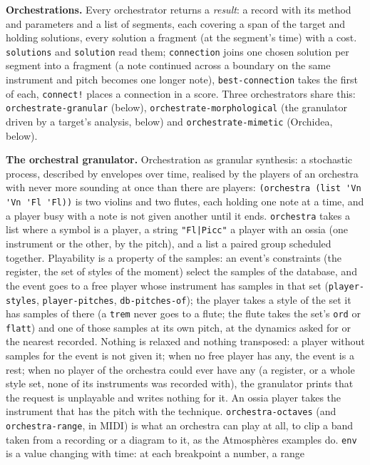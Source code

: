 \documentclass[11pt,a4paper]{article}
\newcommand{\musil}[1]{\lstinline[style=musilinline]{#1}}
\begin{document}
\textbf{Orchestrations.} Every orchestrator returns a \emph{result}: a record with its
method and parameters and a list of segments, each covering a span of the target and
holding solutions, every solution a fragment (at the segment's time) with a cost.
\musil{solutions} and \musil{solution} read them; \musil{connection} joins one chosen
solution per segment into a fragment (a note continued across a boundary on the same
instrument and pitch becomes one longer note), \musil{best-connection} takes the first
of each, \musil{connect!} places a connection in a score. Three orchestrators share this:
\musil{orchestrate-granular} (below), \musil{orchestrate-morphological} (the granulator driven by a target's analysis, below) and
\musil{orchestrate-mimetic} (Orchidea, below).

\textbf{The orchestral granulator.} Orchestration as granular synthesis: a stochastic
process, described by envelopes over time, realised by the players of an orchestra with
never more sounding at once than there are players: \musil{(orchestra (list 'Vn 'Vn 'Fl
'Fl))} is two violins and two flutes, each holding one note at a time, and a player busy
with a note is not given another until it ends. \musil{orchestra} takes a list where a
symbol is a player, a string \musil{"Fl|Picc"} a player with an ossia (one instrument or
the other, by the pitch), and a list a paired group scheduled together. Playability is a
property of the samples: an event's constraints (the register, the set of styles of the
moment) select the samples of the database, and the event goes to a free player whose
instrument has samples in that set (\musil{player-styles}, \musil{player-pitches},
\musil{db-pitches-of}); the player takes a style of the set it has samples of there (a
\musil{trem} never goes to a flute; the flute takes the set's \musil{ord} or
\musil{flatt}) and one of those samples at its own pitch, at the dynamics asked for or
the nearest recorded. Nothing is relaxed and nothing transposed: a player without samples
for the event is not given it; when no free player has any, the event is a rest; when no
player of the orchestra could ever have any (a register, or a whole style set, none of
its instruments was recorded with), the granulator prints that the request is unplayable
and writes nothing for it. An ossia player takes the
instrument that has the pitch with the technique. \musil{orchestra-octaves} (and
\musil{orchestra-range}, in MIDI) is what an orchestra can play at all, to clip a band taken
from a recording or a diagram to it, as the Atmosphères examples do.
\musil{env} is a value changing with time: at each breakpoint a number, a range
\end{document}
